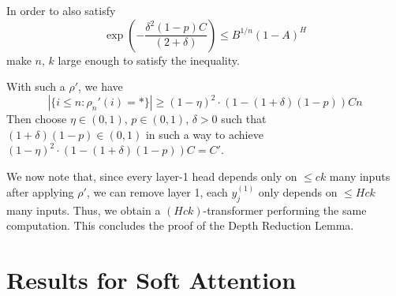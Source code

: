 \documentclass[11pt,a4paper]{article}
\begin{document}
In order to also satisfy
\begin{equation}
\exp\left(-\frac{\delta^2(1-p)C}{(2+\delta)}\right)  \leq B^{1/n} (1-A)^H
\end{equation}
make $n$, $k$ large enough to satisfy the inequality. %


With such a $\rho'$, we have
\begin{equation}
|\{i \leq n: \rho_n'(i) = *\}| \geq (1-\eta)^2\cdot (1-(1+\delta)(1-p)) C n
\end{equation}
Then choose $\eta \in (0,1)$, $p \in (0,1)$, $\delta >0$ such that $(1+\delta)(1-p) \in (0,1)$ in such a way to achieve $(1-\eta)^2\cdot (1-(1+\delta)(1-p)) C = C'$.




We now note that, since every layer-1 head depends only on $\leq ck$ many inputs after applying $\rho'$, we can remove layer 1, each $y_j^{(1)}$ only depends on $\leq Hck$ many inputs.
Thus, we obtain a $(Hck)$-transformer performing the same computation.
This concludes the proof of the Depth Reduction Lemma.





\section{Results for Soft Attention}


\end{document}
